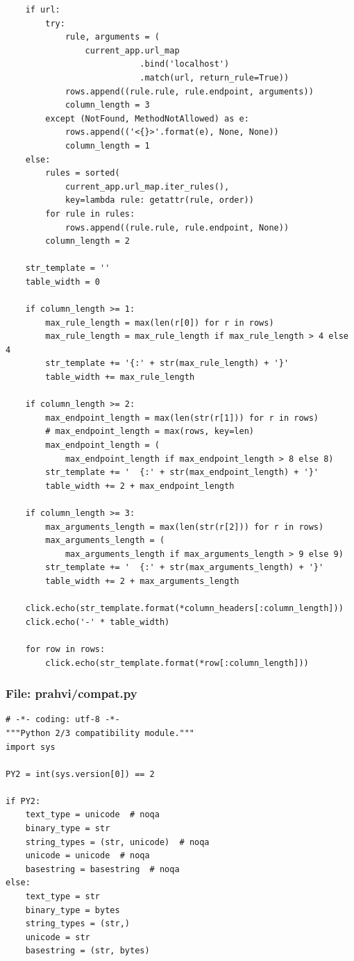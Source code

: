 \begin{lstlisting}
    if url:
        try:
            rule, arguments = (
                current_app.url_map
                           .bind('localhost')
                           .match(url, return_rule=True))
            rows.append((rule.rule, rule.endpoint, arguments))
            column_length = 3
        except (NotFound, MethodNotAllowed) as e:
            rows.append(('<{}>'.format(e), None, None))
            column_length = 1
    else:
        rules = sorted(
            current_app.url_map.iter_rules(),
            key=lambda rule: getattr(rule, order))
        for rule in rules:
            rows.append((rule.rule, rule.endpoint, None))
        column_length = 2

    str_template = ''
    table_width = 0

    if column_length >= 1:
        max_rule_length = max(len(r[0]) for r in rows)
        max_rule_length = max_rule_length if max_rule_length > 4 else 4
        str_template += '{:' + str(max_rule_length) + '}'
        table_width += max_rule_length

    if column_length >= 2:
        max_endpoint_length = max(len(str(r[1])) for r in rows)
        # max_endpoint_length = max(rows, key=len)
        max_endpoint_length = (
            max_endpoint_length if max_endpoint_length > 8 else 8)
        str_template += '  {:' + str(max_endpoint_length) + '}'
        table_width += 2 + max_endpoint_length

    if column_length >= 3:
        max_arguments_length = max(len(str(r[2])) for r in rows)
        max_arguments_length = (
            max_arguments_length if max_arguments_length > 9 else 9)
        str_template += '  {:' + str(max_arguments_length) + '}'
        table_width += 2 + max_arguments_length

    click.echo(str_template.format(*column_headers[:column_length]))
    click.echo('-' * table_width)

    for row in rows:
        click.echo(str_template.format(*row[:column_length]))
\end{lstlisting}

\subsubsection{File: prahvi/compat.py}
\begin{lstlisting}
# -*- coding: utf-8 -*-
"""Python 2/3 compatibility module."""
import sys

PY2 = int(sys.version[0]) == 2

if PY2:
    text_type = unicode  # noqa
    binary_type = str
    string_types = (str, unicode)  # noqa
    unicode = unicode  # noqa
    basestring = basestring  # noqa
else:
    text_type = str
    binary_type = bytes
    string_types = (str,)
    unicode = str
    basestring = (str, bytes)
\end{lstlisting}

